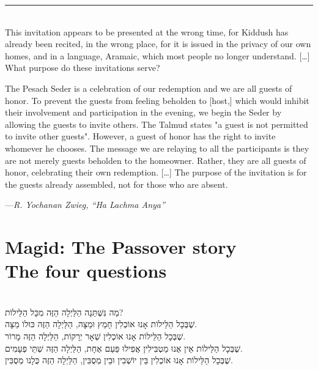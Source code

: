 \documentclass[a4paper,12pt,openany]{memoir}
\newcommand{\HgInst}[1]{{\noindent\sffamily{\bfseries{#1}}}}
\newcommand{\HgSource}[1]{\hfill{\small---\itshape{#1}}}
\newcommand{\HgFill}{\vfill \hrule \vfill}
\newenvironment{HgEnglish}{\strut\\\noindent}{\vspace{1em}}
\newenvironment{HgHebrew}{\begin{hebrew}\strut\\\noindent\Large}{\end{hebrew}}
\begin{document}
\HgFill

\begin{HgEnglish}
This invitation appears to be presented at the wrong time, for Kiddush has
already been recited, in the wrong place, for it is issued in the privacy of our
own homes, and in a language, Aramaic, which most people no longer understand.
[\ldots] What purpose do these invitations serve?

The Pesach Seder is a celebration of our redemption and we are all guests of
honor. To prevent the guests from feeling beholden to [host,] which would
inhibit their involvement and participation in the evening, we begin the Seder
by allowing the guests to invite others. The Talmud states "a guest is not
permitted to invite other guests". However, a guest of honor has the right to
invite whomever he chooses. The message we are relaying to all the participants
is they are not merely guests beholden to the homeowner. Rather, they are all
guests of honor, celebrating their own redemption. [\ldots] The purpose of the
invitation is for the guests already assembled, not for those who are absent.

\HgSource{R. Yochanan Zwieg, ``Ha Lachma Anya''}
\end{HgEnglish}

\chapter*{Magid: The Passover story \\ {\LARGE The four questions}}

\vfill

\HgInst{The youngest person present recites:}

\begin{HgHebrew}
מַה נִּשְּׁתַּנָה הַלַּיְלָה הַזֶּה מִכָּל הַלֵּילוֹת? 
\\
שֶׁבְּכָל הַלֵּילוֹת אָנוּ אוֹכְלִין חָמֵץ וּמַצָּה,
הַלַּיְלָה הַזֶּה כּוּלוֹ מַצָּה. 
\\
שֶׁבְּכָל הַלֵּילוֹת אָנוּ אוֹכְלִין שְׁאָר יְרָקוֹת,
הַלַּיְלָה הַזֶּה מָרוֹר. 
\\
שֶׁבְּכָל הַלֵּילוֹת אֵין אֶנוּ מַטְבִּילִין אֲפִילוּ פַּעַם אֶחָת, 
הַלַּיְלָה הַזֶּה שְׁתֵּי פְעָמִים. 
\\
שֶׁבְּכָל הַלֵּילוֹת אָנוּ אוֹכְלִין בֵּין יוֹשְׁבִין וּבֵין מְסֻבִּין, 
הַלַּיְלָה הַזֶּה כֻּלָנו מְסֻבִּין. 
\end{HgHebrew}
\end{document}
